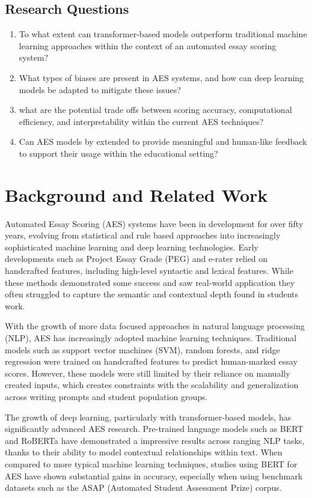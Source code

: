 \documentclass[11pt]{article}
\begin{document}
\subsection{Research Questions}
\begin{enumerate}
    \item To what extent can transformer-based models outperform traditional machine learning approaches within the context of an automated essay scoring system?
    \item What types of biases are present in AES systems, and how can deep learning models be adapted to mitigate these issues?
    \item what are the potential trade offs between scoring accuracy, computational efficiency, and interpretability within the current AES techniques?
    \item Can AES models by extended to provide meaningful and human-like feedback to support their usage within the educational setting?
\end{enumerate}

\section*{Background and Related Work}
Automated Essay Scoring (AES) systems have been in development for over fifty years, evolving from statistical 
and rule based approaches into increasingly sophisticated machine learning and deep learning technologies. Early 
developments such as Project Essay Grade (PEG) and e-rater relied on handcrafted features, including high-level 
syntactic and lexical features. While these methods demonstrated some success and saw real-world application they 
often struggled to capture the semantic and contextual depth found in students work.

With the growth of more data focused approaches in natural language processing (NLP), AES has increasingly adopted 
machine learning techniques. Traditional models such as support vector machines (SVM), random forests, and ridge 
regression were trained on handcrafted features to predict human-marked essay scores. However, these models were 
still limited by their reliance on manually created inputs, which creates constraints with the scalability and 
generalization across writing prompts and student population groups.

The growth of deep learning, particularly with transformer-based models, has significantly advanced AES research. 
Pre-trained language models such as BERT and RoBERTa have demonstrated a impressive results across ranging NLP tasks, 
thanks to their ability to model contextual relationships within text. When compared to more typical machine learning 
techniques, studies using BERT for AES have shown substantial gains in accuracy, especially when using benchmark datasets 
such as the ASAP (Automated Student Assessment Prize) corpus.
\end{document}
